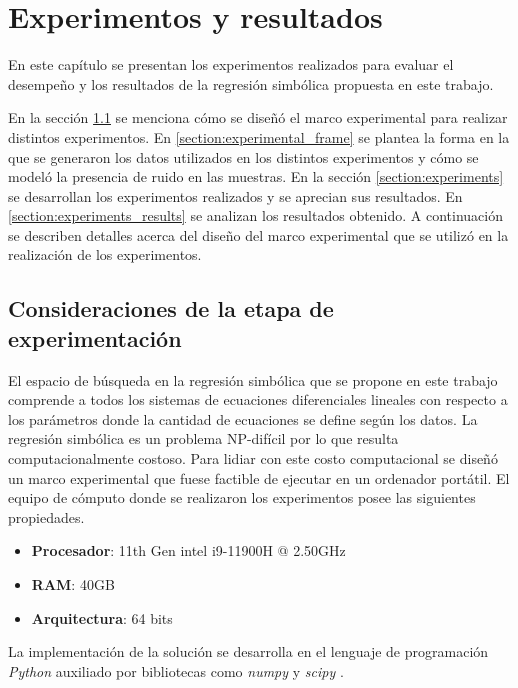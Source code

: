 \chapter{Experimentos y resultados}\label{chapter:results}

En este capítulo se presentan los experimentos realizados para evaluar el desempeño y los resultados de la regresión simbólica propuesta en este trabajo.

En la sección \ref{section:experimental_considerations} se menciona cómo se diseñó el marco experimental para realizar distintos experimentos. En \ref{section:experimental_frame} se plantea la forma en la que se generaron los datos utilizados en los distintos experimentos y cómo se modeló la presencia de ruido en las muestras. En la sección \ref{section:experiments} se desarrollan los experimentos realizados y se aprecian sus resultados. En \ref{section:experiments_results} se analizan los resultados obtenido. A continuación se describen detalles acerca del diseño del marco experimental que se utilizó en la realización de los experimentos.

\section{Consideraciones de la etapa de experimentación}\label{section:experimental_considerations}

El espacio de búsqueda en la regresión simbólica que se propone en este trabajo comprende a todos los sistemas de ecuaciones diferenciales lineales con respecto a los parámetros donde la cantidad de ecuaciones se define según los datos. La regresión simbólica es un problema NP-difícil por lo que resulta computacionalmente costoso. Para lidiar con este costo computacional se diseñó un marco experimental que fuese factible de ejecutar en un ordenador portátil. El equipo de cómputo donde se realizaron los experimentos posee las siguientes propiedades.

\begin{itemize}
    \item \textbf{Procesador}: 11th Gen intel i9-11900H @ 2.50GHz
    \item \textbf{RAM}: 40GB
    \item \textbf{Arquitectura}: 64 bits
\end{itemize}

La implementación de la solución se desarrolla en el lenguaje de programación \emph{Python} auxiliado por bibliotecas como \emph{numpy} \cite{harris2020array} y \emph{scipy} \cite{2020SciPy-NMeth}.


